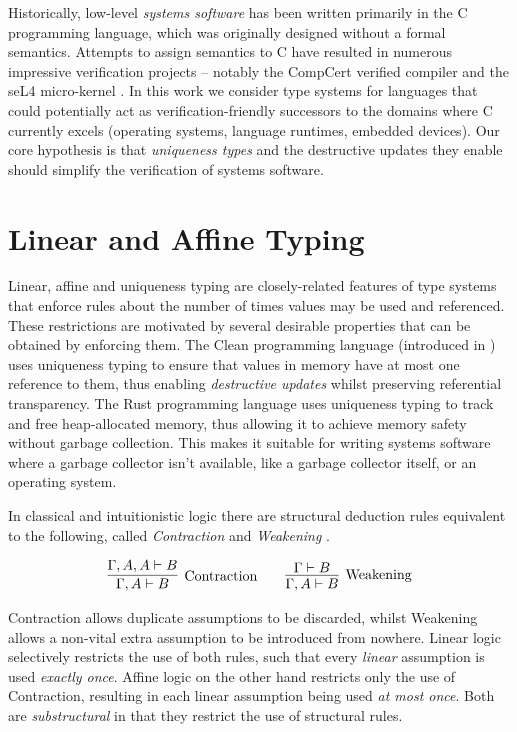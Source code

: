 \documentclass[]{unswthesis}
\begin{document}
Historically, low-level \textit{systems software} has been written primarily in the C programming language, which was originally designed without a formal semantics. Attempts to assign semantics to C have resulted in numerous impressive verification projects -- notably the CompCert verified compiler \cite{leroy09} and the seL4 micro-kernel \cite{klein14}. In this work we consider type systems for languages that could potentially act as verification-friendly successors to the domains where C currently excels (operating systems, language runtimes, embedded devices). Our core hypothesis is that \textit{uniqueness types} and the destructive updates they enable should simplify the verification of systems software.

\section{Linear and Affine Typing}

Linear, affine and uniqueness typing are closely-related features of type systems that enforce rules about the number of times values may be used and referenced. These restrictions are motivated by several desirable properties that can be obtained by enforcing them. The Clean programming language (introduced in \cite{clean87}) uses uniqueness typing to ensure that values in memory have at most one reference to them, thus enabling \textit{destructive updates} whilst preserving referential transparency. The Rust programming language \cite{rustWeb} uses uniqueness typing to track and free heap-allocated memory, thus allowing it to achieve memory safety without garbage collection. This makes it suitable for writing systems software where a garbage collector isn't available, like a garbage collector itself, or an operating system.

In classical and intuitionistic logic there are structural deduction rules equivalent to the following, called \textit{Contraction} and \textit{Weakening} \cite{wadler90, wadler93}.

\begin{eqnarray*}
\infer[\text{Contraction}]{\Gamma, A \vdash B}{
	\Gamma, A, A \vdash B
}
\qquad
\infer[\text{Weakening}]{\Gamma, A \vdash B}{
    \Gamma \vdash B
}
\end{eqnarray*}

Contraction allows duplicate assumptions to be discarded, whilst Weakening allows a non-vital extra assumption to be introduced from nowhere. Linear logic \cite{girard87} selectively restricts the use of both rules, such that every \textit{linear} assumption is used \textit{exactly once}. Affine logic on the other hand restricts only the use of Contraction, resulting in each linear assumption being used \textit{at most once}. Both are \textit{substructural} in that they restrict the use of structural rules.
\end{document}
